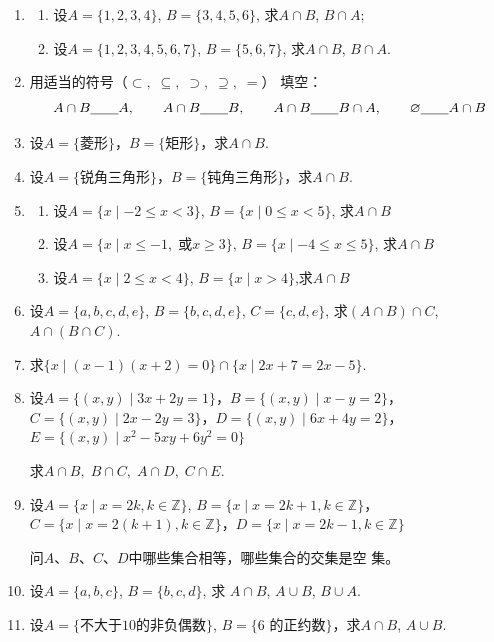 \begin{enumerate}
    \item \begin{enumerate}[(1)]
        \item 设$A=\{1,2,3,4\}$, $B=\{3,4,5,6\}$, 求$A\cap B$, $B\cap A$; 
        \item 设$A=\{1,2,3,4,5,6,7\}$, $B=\{5,6,7\}$, 
   求$A\cap B$, $B\cap A$.
    \end{enumerate}

\item 用适当的符号（$\subset,\; \subseteq,\; \supset,\; \supseteq,\; =$）
填空：
\[A\cap B\underline{\qquad} A,\qquad A\cap B\underline{\qquad} B,\qquad A\cap B\underline{\qquad} B\cap A,\qquad \varnothing\underline{\qquad} A\cap B\] 
\item 设$A=\{\text{菱形}\}$，$B=\{\text{矩形}\}$，求$A\cap B$.
\item 设$A=\{\text{锐角三角形}\}$，$B=\{\text{钝角三角形}\}$，求$A\cap B$.
\item \begin{enumerate}[(1)]
    \item 设$A=\{x\mid -2\le x<3\}$, $B=\{x\mid 0\le x<5\}$, 求$A\cap B$
    \item 设$A=\{x\mid x\le -1,\; \text{或}x\ge 3\}$, $B=\{x\mid -4\le x\le 5\}$, 求$A\cap B$
    \item 设$A=\{x\mid 2\le  x<4\}$, $B=\{x\mid x>4\}$,求$A\cap B$
\end{enumerate}
\item 设$A=\{a,b,c,d,e\}$, $B=\{b,c,d,e\}$, $C=\{c,d,e\}$, 求$(A\cap B)\cap C$, $A\cap(B\cap C)$.
\item 求$\{x\mid (x-1)(x+2)=0\}\cap\{x\mid 2x+7=2x-5\}$.


\item 设$A=\{(x,y)\mid 3x+2y=1\}$，$B=\{(x,y)\mid x-y=2\}$，$C=\{(x,y)\mid 2x-2y=3\}$，$D=\{(x,y)\mid 6x+4y=2\}$，$E=\{(x,y)\mid x^2-5xy+6y^2=0\}$

求$A\cap B,\; B\cap C,\; A\cap D,\; C\cap E$.

\item 设$A=\{x\mid x=2k,k\in \mathbb{Z}\}$, $B=\{x\mid x=2k+1,k\in \mathbb{Z}\}$，$C=\{x\mid x=2(k+1), k\in\mathbb{Z}\}$，$D=\{x\mid x=2k-1, k\in\mathbb{Z}\}$

问$A$、$B$、$C$、$D$中哪些集合相等，哪些集合的交集是空
集。
\item 设$A=\{a,b,c\}$, $B=\{b,c,d\}$, 求
$A\cap B$, $A\cup B$, $B\cup A$.

\item 设$A=\{\text{不大于10的非负偶数}\}$, $B=\{\text{6
的正约数}\}$，求$A\cap B$, $A\cup B$.


\end{enumerate}
